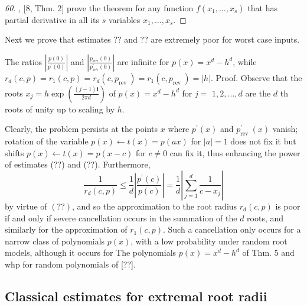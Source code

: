 \documentclass[sigconf]{acmart}
\begin{document}
\begin{proof}
[60], [8, Thm. 2] prove the theorem for any function $f\left(x_{1}, \ldots, x_{s}\right)$ that has partial derivative in all its $s$ variables $x_{1}, \ldots, x_{s}$.
\end{proof}

Next we prove that estimates $??$ and $??$ are extremely poor for worst case inputs.

\begin{theorem}
The ratios $\left|\frac{p(0)}{p^{\prime}(0)}\right|$ and $\left|\frac{p_{\mathrm{rev}}(0)}{p_{\mathrm{rev}}^{\prime}(0)}\right|$ are infinite for $p(x)=x^{d}-h^{d}$, while $r_{d}(c, p)=r_{1}(c, p)=r_{d}\left(c, p_{\text {rev }}\right)=r_{1}\left(c, p_{\text {rev }}\right)=|h|$.
Proof. Observe that the roots $x_{j}=h \exp \left(\frac{(j-1) \mathbf{i}}{2 \pi d}\right)$ of $p(x)=x^{d}-h^{d}$ for $j=$ $1,2, \ldots, d$ are the $d$ th roots of unity up to scaling by $h$.
\end{theorem}

Clearly, the problem persists at the points $x$ where $p^{\prime}(x)$ and $p_{\text {rev }}^{\prime}(x)$ vanish; rotation of the variable $p(x) \leftarrow t(x)=p(a x)$ for $|a|=1$ does not fix it but shifts $p(x) \leftarrow t(x)=p(x-c)$ for $c \neq 0$ can fix it, thus enhancing the power of estimates (??) and (??).
Furthermore,
$$
\frac{1}{r_{d}(c, p)} \leq \frac{1}{d}\left|\frac{p^{\prime}(c)}{p(c)}\right|=\frac{1}{d}\left|\sum_{j=1}^{d} \frac{1}{c-x_{j}}\right|
$$
by virtue of $(??)$, and so the approximation to the root radius $r_{d}(c, p)$ is poor if and only if severe cancellation occurs in the summation of the $d$ roots, and similarly for the approximation of $r_{1}(c, p)$. Such a cancellation only occurs for a narrow class of polynomials $p(x)$, with a low probability under random root models, although it occurs for The polynomials $p(x)=x^{d}-h^{d}$ of Thm. 5 and whp for random polynomials of [??].

\subsection{Classical estimates for extremal root radii}\label{subsec:class_est}
\end{document}

